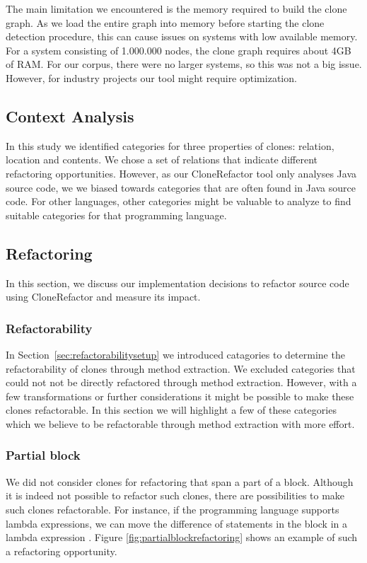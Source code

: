 The main limitation we encountered is the memory required to build the clone graph. As we load the entire graph into memory before starting the clone detection procedure, this can cause issues on systems with low available memory. For a system consisting of 1.000.000 nodes, the clone graph requires about 4GB of RAM. For our corpus, there were no larger systems, so this was not a big issue. However, for industry projects our tool might require optimization.

\subsection{Context Analysis}
In this study we identified categories for three properties of clones: relation, location and contents. We chose a set of relations that indicate different refactoring opportunities. However, as our CloneRefactor tool only analyses Java source code, we we biased towards categories that are often found in Java source code. For other languages, other categories might be valuable to analyze to find suitable categories for that programming language.

\subsection{Refactoring}
In this section, we discuss our implementation decisions to refactor source code using CloneRefactor and measure its impact.

\subsubsection{Refactorability} \label{sec:discussrefactorability}
In Section~\ref{sec:refactorabilitysetup} we introduced catagories to determine the refactorability of clones through method extraction. We excluded categories that could not not be directly refactored through method extraction. However, with a few transformations or further considerations it might be possible to make these clones refactorable. In this section we will highlight a few of these categories which we believe to be refactorable through method extraction with more effort.

\subsubsection{Partial block} \label{sec:partialblockdiscussion}
We did not consider clones for refactoring that span a part of a block. Although it is indeed not possible to refactor such clones, there are possibilities to make such clones refactorable. For instance, if the programming language supports lambda expressions, we can move the difference of statements in the block in a lambda expression \cite{tsantalis2017clone}. Figure \ref{fig:partialblockrefactoring} shows an example of such a refactoring opportunity.

